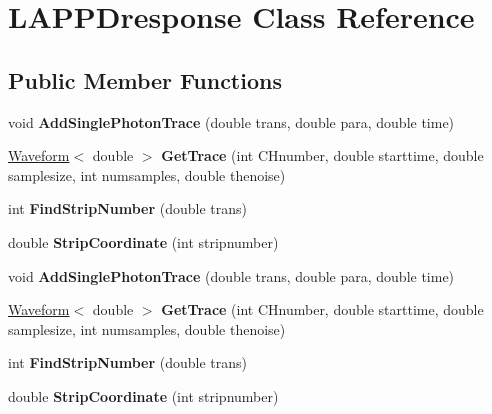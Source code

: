 \hypertarget{classLAPPDresponse}{\section{L\-A\-P\-P\-Dresponse Class Reference}
\label{classLAPPDresponse}
}
\subsection*{Public Member Functions}
\begin{DoxyCompactItemize}
\item 
\hypertarget{classLAPPDresponse_a5d53c8ca94cd0b1d2f389df41b3c71d0}{void {\bfseries Add\-Single\-Photon\-Trace} (double trans, double para, double time)}\label{classLAPPDresponse_a5d53c8ca94cd0b1d2f389df41b3c71d0}

\item 
\hypertarget{classLAPPDresponse_a6dc34922a8a63dc84fa2758ad7ae07f5}{\hyperlink{classWaveform}{Waveform}$<$ double $>$ {\bfseries Get\-Trace} (int C\-Hnumber, double starttime, double samplesize, int numsamples, double thenoise)}\label{classLAPPDresponse_a6dc34922a8a63dc84fa2758ad7ae07f5}

\item 
\hypertarget{classLAPPDresponse_af7ea4eaf42b67cd816a1205c84e9756b}{int {\bfseries Find\-Strip\-Number} (double trans)}\label{classLAPPDresponse_af7ea4eaf42b67cd816a1205c84e9756b}

\item 
\hypertarget{classLAPPDresponse_a7006a41063a44bec116b5763dfd218ac}{double {\bfseries Strip\-Coordinate} (int stripnumber)}\label{classLAPPDresponse_a7006a41063a44bec116b5763dfd218ac}

\item 
\hypertarget{classLAPPDresponse_a5d53c8ca94cd0b1d2f389df41b3c71d0}{void {\bfseries Add\-Single\-Photon\-Trace} (double trans, double para, double time)}\label{classLAPPDresponse_a5d53c8ca94cd0b1d2f389df41b3c71d0}

\item 
\hypertarget{classLAPPDresponse_adcf4b1cb461f805e4f2b0106ad24a87d}{\hyperlink{classWaveform}{Waveform}$<$ double $>$ {\bfseries Get\-Trace} (int C\-Hnumber, double starttime, double samplesize, int numsamples, double thenoise)}\label{classLAPPDresponse_adcf4b1cb461f805e4f2b0106ad24a87d}

\item 
\hypertarget{classLAPPDresponse_af7ea4eaf42b67cd816a1205c84e9756b}{int {\bfseries Find\-Strip\-Number} (double trans)}\label{classLAPPDresponse_af7ea4eaf42b67cd816a1205c84e9756b}

\item 
\hypertarget{classLAPPDresponse_a7006a41063a44bec116b5763dfd218ac}{double {\bfseries Strip\-Coordinate} (int stripnumber)}\label{classLAPPDresponse_a7006a41063a44bec116b5763dfd218ac}

\end{DoxyCompactItemize}
